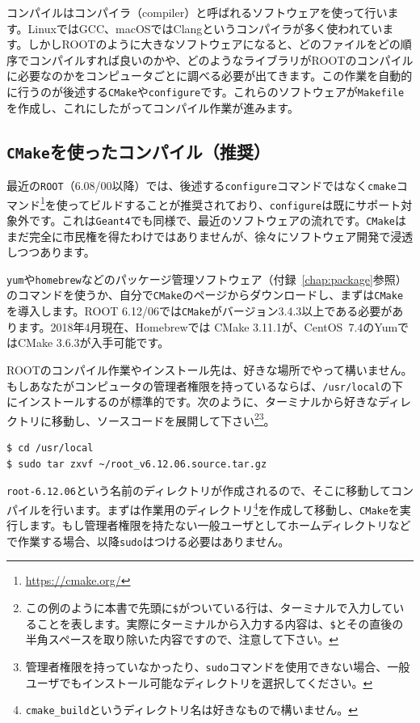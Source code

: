 コンパイルはコンパイラ（compiler）と呼ばれるソフトウェアを使って行います。LinuxではGCC、macOSではClangというコンパイラが多く使われています。しかしROOTのように大きなソフトウェアになると、どのファイルをどの順序でコンパイルすれば良いのかや、どのようなライブラリがROOTのコンパイルに必要なのかをコンピュータごとに調べる必要が出てきます。この作業を自動的に行うのが後述する\texttt{CMake}や\texttt{configure}です。これらのソフトウェアが\texttt{Makefile}を作成し、これにしたがってコンパイル作業が進みます。

\subsection{\texttt{CMake}を使ったコンパイル（推奨）}
\label{subsec:compile_cmake}
最近の\texttt{ROOT}（6.08/00以降）では、後述する\texttt{configure}コマンドではなく\texttt{cmake}コマンド\footnote{\url{https://cmake.org/}}を使ってビルドすることが推奨されており、\texttt{configure}は既にサポート対象外です。これは\texttt{Geant4}でも同様で、最近のソフトウェアの流れです。\texttt{CMake}はまだ完全に市民権を得たわけではありませんが、徐々にソフトウェア開発で浸透しつつあります。

\texttt{yum}や\texttt{homebrew}などのパッケージ管理ソフトウェア（付録~\ref{chap:package}参照）のコマンドを使うか、自分で\texttt{CMake}のページからダウンロードし、まずは\texttt{CMake}を導入します。ROOT 6.12/06では\texttt{CMake}がバージョン3.4.3以上である必要があります。2018年4月現在、Homebrewでは CMake 3.11.1が、CentOS~7.4のYumではCMake 3.6.3が入手可能です。

ROOTのコンパイル作業やインストール先は、好きな場所でやって構いません。もしあなたがコンピュータの管理者権限を持っているならば、\texttt{/usr/local}の下にインストールするのが標準的です。次のように、ターミナルから好きなディレクトリに移動し、ソースコードを展開して下さい\footnote{この例のように本書で先頭に\texttt{\$}がついている行は、ターミナルで入力していることを表します。実際にターミナルから入力する内容は、\texttt{\$}とその直後の半角スペースを取り除いた内容ですので、注意して下さい。}\footnote{管理者権限を持っていなかったり、\texttt{sudo}コマンドを使用できない場合、一般ユーザでもインストール可能なディレクトリを選択してください。}。

\begin{lstlisting}[language=bash]
$ cd /usr/local
$ sudo tar zxvf ~/root_v6.12.06.source.tar.gz
\end{lstlisting}

\texttt{root-6.12.06}という名前のディレクトリが作成されるので、そこに移動してコンパイルを行います。まずは作業用のディレクトリ\footnote{\texttt{cmake\_build}というディレクトリ名は好きなもので構いません。}を作成して移動し、\texttt{CMake}を実行します。もし管理者権限を持たない一般ユーザとしてホームディレクトリなどで作業する場合、以降\texttt{sudo}はつける必要はありません。

